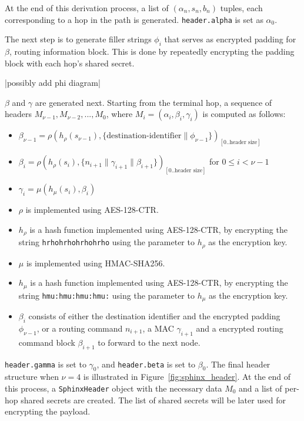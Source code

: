\documentclass[12pt,a4paper,twoside,openright]{report}
\begin{document}
At the end of this derivation process, a list of $(\alpha_n, s_n, b_n)$ tuples, each corresponding to a hop in the path is generated. \verb|header.alpha| is set as $\alpha_0$.

The next step is to generate filler strings $\phi_i$ that serves as encrypted padding for $\beta$, routing information block. This is done by repeatedly encrypting the padding block with each hop's shared secret.

|possibly add phi diagram|

$\beta$ and $\gamma$ are generated next. Starting from the terminal hop, a sequence of headers $M_{\nu-1},M_{\nu-2},...,M_{0}$, where $M_i = (\alpha_i, \beta_i, \gamma_i)$ is computed as follows:

\begin{itemize}
	\setlength\itemsep{-0em}
	\item $\beta_{\nu-1} = \rho(h_\rho(s_{\nu-1}), \{{\text{destination-identifier}}\|\phi_{\nu-1}\})_{[0..\text{header size}]}$
	\item $\beta_{i} = \rho(h_\rho(s_{i}), \{n_{i+1} \| \gamma_{i+1} \| \beta_{i+1}\})_{[0..\text{header size}]}$ for $0 \le i < \nu - 1$
	\item $\gamma_i = \mu(h_\mu(s_{i}), \beta_i)$
\end{itemize}

\begin{itemize}
	\item $\rho$ is implemented using AES-128-CTR.
	\item $h_\rho$ is a hash function implemented using AES-128-CTR, by encrypting the string \verb|hrhohrhohrhohrho| using the parameter to $h_\rho$ as the encryption key.
	\item $\mu$ is implemented using HMAC-SHA256.
	\item $h_\mu$ is a hash function implemented using AES-128-CTR, by encrypting the string \verb|hmu:hmu:hmu:hmu:| using the parameter to $h_\mu$ as the encryption key.
	\item $\beta_i$ consists of either the destination identifier and the encrypted padding $\phi_{\nu-1}$, or a routing command $n_{i+1}$, a MAC $\gamma_{i+1}$ and a encrypted routing command block $\beta_{i+1}$ to forward to the next node.
\end{itemize}

\verb|header.gamma| is set to $\gamma_0$, and \verb|header.beta| is set to $\beta_0$. The final header structure when $\nu = 4$ is illustrated in Figure~\ref{fig:sphinx_header}. At the end of this process, a \verb|SphinxHeader| object with the necessary data $M_0$ and a list of per-hop shared secrets are created. The list of shared secrets will be later used for encrypting the payload.
\end{document}
